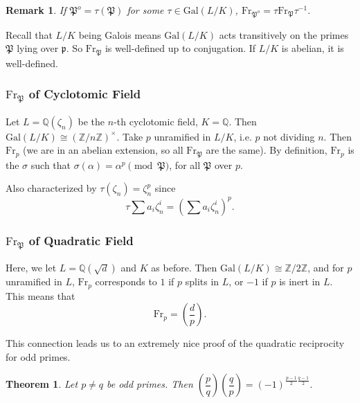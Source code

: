\documentclass[letterpaper, 12pt]{article}
\newtheorem{rmk}{Remark}
\newtheorem{thm}{Theorem}[subsection]
\newcommand{\gal}[3]{\mathrm{Gal}(#1 #2 #3)}
\newcommand{\iso}{\cong}
\newcommand{\rats}{\mathbb{Q}}
\renewcommand{\prime}{\mathfrak{p}}
\newcommand{\oprime}{\mathfrak{P}}
\newcommand{\oprimealt}{\oprime^o}
\newcommand{\frob}[1]{\mathrm{Fr}_{#1}}
\newcommand{\legndr}[2]{\left(\dfrac{#1}{#2}\right)}
\newcommand{\Z}[1]{\mathbb{Z}/#1 \mathbb{Z}}
\newcommand{\Znu}{\left(\mathbb{Z}/n\mathbb{Z}\right)^\times}
\begin{document}
\begin{rmk}

If $\oprimealt = \tau(\oprime)$ for some $\tau \in \gal L/K$, $\frob
\oprimealt = \tau \frob \oprime \tau^{-1}$.

\end{rmk}

Recall that $L/K$ being Galois means $\gal L/K$ acts transitively on the
primes $\oprime$ lying over $\prime$. So $\frob \oprime$ is well-defined up to
conjugation. If $L/K$ is abelian, it is well-defined.

\subsubsection{$\frob \oprime$ of Cyclotomic Field}

Let $L = \rats(\zeta_n)$ be the $n$-th cyclotomic field, $K = \rats$. Then
$\gal L/K \iso \Znu$. Take $p$ unramified in $L/K$, i.e. $p$ not dividing $n$.
Then $\frob p$ (we are in an abelian extension, so all $\frob \oprime$ are the
same). By definition, $\frob p$ is the $\sigma$ such that $\sigma(\alpha) =
\alpha^p \pmod \oprime$, for all $\oprime$ over $p$.

Also characterized by $\tau(\zeta_n) = \zeta_n^p$ since \[\tau \sum a_i
\zeta_n^i = (\sum a_i \zeta_n^i)^p.\]

\subsubsection{$\frob \oprime$ of Quadratic Field}

Here, we let $L = \rats(\sqrt{d})$ and $K$ as before. Then $\gal L/K \iso \Z
2$, and for $p$ unramified in $L$, $\frob p$ corresponds to $1$ if $p$ splits
in $L$, or $-1$ if $p$ is inert in $L$. This means that \[\frob p = \legndr d
p.\]

This connection leads us to an extremely nice proof of the quadratic reciprocity
for odd primes.

\begin{thm}
Let $p \neq q$ be odd primes. Then $\legndr p q \legndr q p = (-1)^{\frac{p -
1}{2} \frac{q - 1}{2}}.$
\end{thm}
\end{document}
